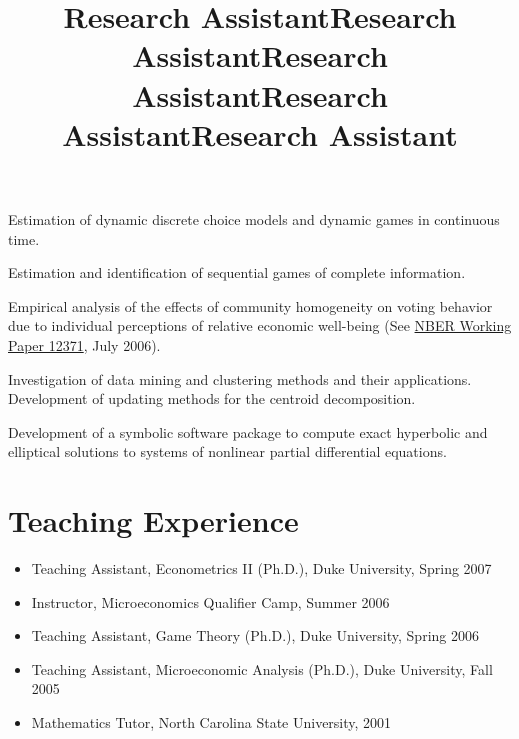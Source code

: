 \documentclass[overlapped,line,letterpaper]{res}
\begin{document}
\begin{resume}
\title{Research Assistant}
\begin{position}
  Estimation of dynamic discrete choice models and dynamic games in
  continuous time.
\end{position}

\title{Research Assistant}
\begin{position}
  Estimation and identification of sequential games of complete information.
\end{position}

\title{Research Assistant}
\begin{position}
  Empirical analysis of the effects of community homogeneity on voting
  behavior due to individual perceptions of relative economic well-being (See
  \href{http://www.nber.org/papers/w12371}{NBER Working Paper 12371}, July
  2006).
\end{position}

\title{Research Assistant}
\begin{position}
  Investigation of data mining and clustering methods and their
  applications. Development of updating methods for the centroid
  decomposition.
\end{position}

\title{Research Assistant}
\begin{position}
  Development of a symbolic software package to compute exact hyperbolic and
  elliptical solutions to systems of nonlinear partial differential
  equations.
\end{position}


\section{\bf Teaching Experience}

\begin{itemize}

\item Teaching Assistant, Econometrics II (Ph.D.), Duke University, Spring 2007
\item Instructor, Microeconomics Qualifier Camp, Summer 2006
\item Teaching Assistant, Game Theory (Ph.D.), Duke University, Spring 2006
\item Teaching Assistant, Microeconomic Analysis (Ph.D.), Duke
  University, Fall 2005
\item Mathematics Tutor, North Carolina State University, 2001
\end{itemize}


\end{resume}
\end{document}
